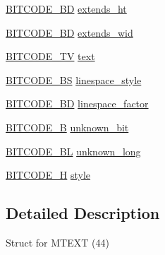 \begin{DoxyCompactItemize}
\hyperlink{dwg_8h_a3c1e6781466b74ba07785d57da70ed97}{\-B\-I\-T\-C\-O\-D\-E\-\_\-\-B\-D} \hyperlink{struct__dwg__entity__MTEXT_ad9b42a5d1b433824816dc05d25e5e43e}{extends\-\_\-ht}
\item 
\hyperlink{dwg_8h_a3c1e6781466b74ba07785d57da70ed97}{\-B\-I\-T\-C\-O\-D\-E\-\_\-\-B\-D} \hyperlink{struct__dwg__entity__MTEXT_a9bc1422fc7590c63d469e6f45137b02e}{extends\-\_\-wid}
\item 
\hyperlink{dwg_8h_a2a7e040c6e36ca039b03608679ecaf7c}{\-B\-I\-T\-C\-O\-D\-E\-\_\-\-T\-V} \hyperlink{struct__dwg__entity__MTEXT_ace1f2c995ec93543ac2e9f2ec1f954f1}{text}
\item 
\hyperlink{dwg_8h_a94297606fbd4a4ff97e8add284af0809}{\-B\-I\-T\-C\-O\-D\-E\-\_\-\-B\-S} \hyperlink{struct__dwg__entity__MTEXT_acbfbae3476d2f9b455dc95d711229b6f}{linespace\-\_\-style}
\item 
\hyperlink{dwg_8h_a3c1e6781466b74ba07785d57da70ed97}{\-B\-I\-T\-C\-O\-D\-E\-\_\-\-B\-D} \hyperlink{struct__dwg__entity__MTEXT_af72eddb6d6f50a09d0da28767f130d16}{linespace\-\_\-factor}
\item 
\hyperlink{dwg_8h_ab533b1f62d9086749e3bb5b67e9f224e}{\-B\-I\-T\-C\-O\-D\-E\-\_\-\-B} \hyperlink{struct__dwg__entity__MTEXT_a611884ac705eebf4a1debf6af2939ed7}{unknown\-\_\-bit}
\item 
\hyperlink{dwg_8h_aebd5f127038868cbabc3d55d91da776c}{\-B\-I\-T\-C\-O\-D\-E\-\_\-\-B\-L} \hyperlink{struct__dwg__entity__MTEXT_aa7a76d4795214087281307ca3cd3467b}{unknown\-\_\-long}
\item 
\hyperlink{dwg_8h_a7c700e94e047a97ba8c24bdfe4029dc3}{\-B\-I\-T\-C\-O\-D\-E\-\_\-\-H} \hyperlink{struct__dwg__entity__MTEXT_a2c81f780d91149b370880f605b237621}{style}
\end{DoxyCompactItemize}


\subsection{\-Detailed \-Description}
\-Struct for \-M\-T\-E\-X\-T (44) 

